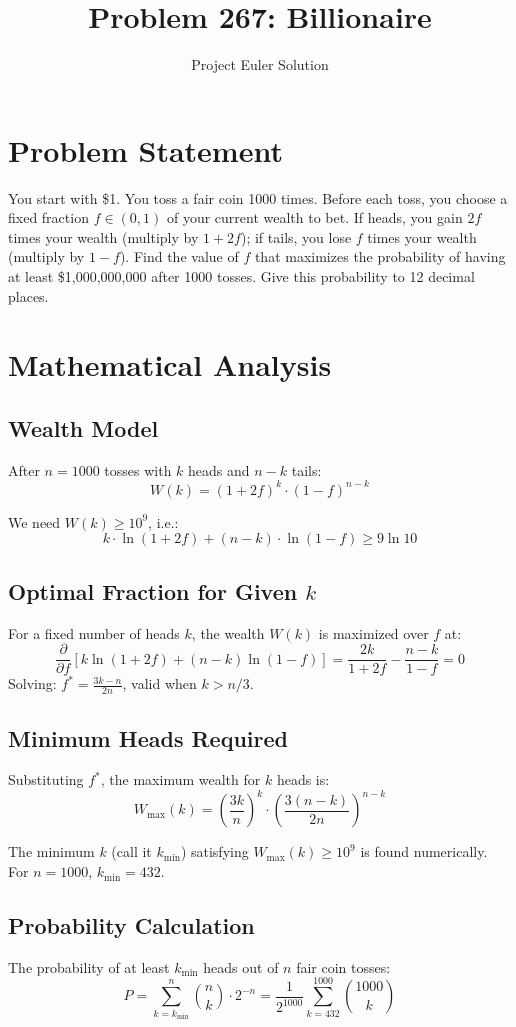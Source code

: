\documentclass[12pt]{article}
\title{Problem 267: Billionaire}
\author{Project Euler Solution}
\date{}
\begin{document}
\maketitle

\section{Problem Statement}
You start with \$1. You toss a fair coin 1000 times. Before each toss, you choose a fixed fraction $f \in (0,1)$ of your current wealth to bet. If heads, you gain $2f$ times your wealth (multiply by $1+2f$); if tails, you lose $f$ times your wealth (multiply by $1-f$). Find the value of $f$ that maximizes the probability of having at least \$1,000,000,000 after 1000 tosses. Give this probability to 12 decimal places.

\section{Mathematical Analysis}

\subsection{Wealth Model}
After $n = 1000$ tosses with $k$ heads and $n-k$ tails:
\[ W(k) = (1+2f)^k \cdot (1-f)^{n-k} \]

We need $W(k) \geq 10^9$, i.e.:
\[ k \cdot \ln(1+2f) + (n-k) \cdot \ln(1-f) \geq 9\ln 10 \]

\subsection{Optimal Fraction for Given $k$}
For a fixed number of heads $k$, the wealth $W(k)$ is maximized over $f$ at:
\[ \frac{\partial}{\partial f}\left[k\ln(1+2f) + (n-k)\ln(1-f)\right] = \frac{2k}{1+2f} - \frac{n-k}{1-f} = 0 \]
Solving: $f^* = \frac{3k - n}{2n}$, valid when $k > n/3$.

\subsection{Minimum Heads Required}
Substituting $f^*$, the maximum wealth for $k$ heads is:
\[ W_{\max}(k) = \left(\frac{3k}{n}\right)^k \cdot \left(\frac{3(n-k)}{2n}\right)^{n-k} \]

The minimum $k$ (call it $k_{\min}$) satisfying $W_{\max}(k) \geq 10^9$ is found numerically. For $n = 1000$, $k_{\min} = 432$.

\subsection{Probability Calculation}
The probability of at least $k_{\min}$ heads out of $n$ fair coin tosses:
\[ P = \sum_{k=k_{\min}}^{n} \binom{n}{k} \cdot 2^{-n} = \frac{1}{2^{1000}} \sum_{k=432}^{1000} \binom{1000}{k} \]
\end{document}
